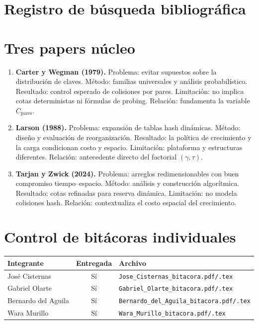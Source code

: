 \documentclass[11pt]{article}
\begin{document}
\clearpage
\section{Registro de búsqueda bibliográfica}


\section{Tres papers núcleo}
\begin{enumerate}[leftmargin=1.5em]
\item \textbf{Carter y Wegman (1979).} Problema: evitar supuestos sobre la distribución de claves. Método: familias universales y análisis probabilístico. Resultado: control esperado de colisiones por pares. Limitación: no implica cotas deterministas ni fórmulas de probing. Relación: fundamenta la variable $C_{\mathrm{pares}}$.
\item \textbf{Larson (1988).} Problema: expansión de tablas hash dinámicas. Método: diseño y evaluación de reorganización. Resultado: la política de crecimiento y la carga condicionan costo y espacio. Limitación: plataforma y estructuras diferentes. Relación: antecedente directo del factorial $(\gamma,\tau)$.
\item \textbf{Tarjan y Zwick (2024).} Problema: arreglos redimensionables con buen compromiso tiempo--espacio. Método: análisis y construcción algorítmica. Resultado: cotas refinadas para reserva dinámica. Limitación: no modela colisiones hash. Relación: contextualiza el costo espacial del crecimiento.
\end{enumerate}

\section{Control de bitácoras individuales}
\begin{table}[H]
\centering\small
\begin{tabularx}{\linewidth}{p{3.7cm}c X}
\toprule Integrante & Entregada & Archivo \\
\midrule
José Cisternas & Sí & \texttt{Jose\_Cisternas\_bitacora.pdf/.tex}\\
Gabriel Olarte & Sí & \texttt{Gabriel\_Olarte\_bitacora.pdf/.tex}\\
Bernardo del Aguila & Sí & \texttt{Bernardo\_del\_Aguila\_bitacora.pdf/.tex}\\
Wara Murillo & Sí & \texttt{Wara\_Murillo\_bitacora.pdf/.tex}\\
\bottomrule
\end{tabularx}
\end{table}
\end{document}
